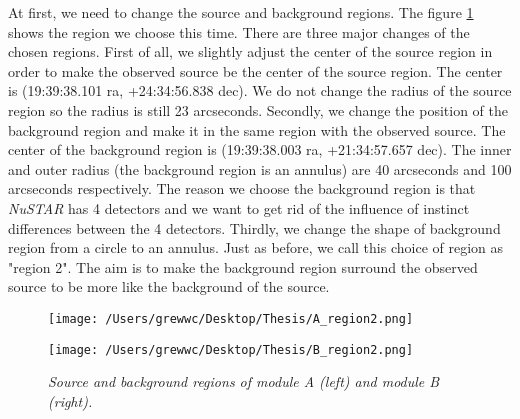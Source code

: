 \documentclass[12pt]{report}
\newcommand{\mycaption}[1]{\caption{\textit{\footnotesize #1}}}
\begin{document}
        \indent
        At first, we need to change the source and background regions. The figure \ref{fig:region2} shows the 
        region we choose this time. There are three major changes of the chosen regions. First of all, we slightly 
        adjust the center of the source region in order to make the observed source be the center of the source 
        region. The center is (19:39:38.101 ra, +24:34:56.838 dec). 
        We do not change the radius of the source region so the radius is still 23 arcseconds. Secondly, we change 
        the position of the background region and make it in the same region with the observed source. The center of the 
        background region is (19:39:38.003 ra, +21:34:57.657 dec). The inner and outer radius (the background region
        is an annulus) are 40 arcseconds and 100 arcseconds respectively. 
        The reason we choose the background region is that  
        \textit{NuSTAR} has 4 detectors and we want to get rid of the influence of instinct differences between the 
        4 detectors. Thirdly, we change the shape of background region from a circle to an annulus. Just as before, 
        we call this choice of region as "region 2". The aim is to 
        make the background region surround the observed source to be more like the background of the source.\\ 
        \begin{figure}[!ht]
          \begin{minipage}{0.45\textwidth}
            \begin{flushleft} 
              \texttt{[image: /Users/grewwc/Desktop/Thesis/A\_region2.png]}
            \end{flushleft}
            \end{minipage}
          \begin{minipage}{0.45\textwidth}
            \begin{flushleft}
              \texttt{[image: /Users/grewwc/Desktop/Thesis/B\_region2.png]}
            \end{flushleft}
          \end{minipage}
          \centering
          \begin{minipage}{0.8\textwidth}
          \mycaption{Source and background regions of module A (left) and module B (right).}
          \label{fig:region2}
          \end{minipage}
        \end{figure}
        
\end{document}

